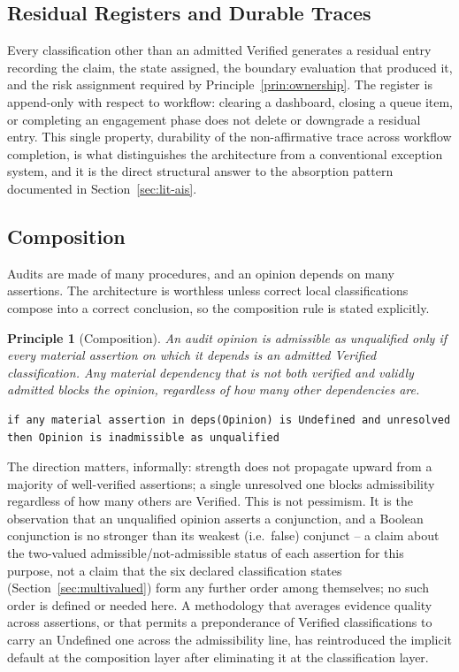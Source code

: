 \documentclass[11pt,a4paper]{article}
\newtheorem{principle}{Principle}[section]
\theoremstyle{definition}
\theoremstyle{remark}
\begin{document}
\subsection{Residual Registers and Durable Traces}
\label{sec:registers}

Every classification other than an admitted \textsf{Verified} generates a residual entry recording the claim, the state assigned, the boundary evaluation that produced it, and the risk assignment required by Principle~\ref{prin:ownership}. The register is append-only with respect to workflow: clearing a dashboard, closing a queue item, or completing an engagement phase does not delete or downgrade a residual entry. This single property, durability of the non-affirmative trace across workflow completion, is what distinguishes the architecture from a conventional exception system, and it is the direct structural answer to the absorption pattern documented in Section~\ref{sec:lit-ais}.

\subsection{Composition}
\label{sec:composition}

Audits are made of many procedures, and an opinion depends on many assertions. The architecture is worthless unless correct local classifications compose into a correct conclusion, so the composition rule is stated explicitly.

\begin{principle}[Composition]
\label{prin:composition}
An audit opinion is admissible as unqualified only if every material assertion on which it depends is an admitted \textsf{Verified} classification. Any material dependency that is not both verified and validly admitted blocks the opinion, regardless of how many other dependencies are.
\end{principle}

\begin{lstlisting}[numbers=none]
if any material assertion in deps(Opinion) is Undefined and unresolved
then Opinion is inadmissible as unqualified
\end{lstlisting}

The direction matters, informally: strength does not propagate upward from a majority of well-verified assertions; a single unresolved one blocks admissibility regardless of how many others are Verified. This is not pessimism. It is the observation that an unqualified opinion asserts a conjunction, and a Boolean conjunction is no stronger than its weakest (i.e.\ false) conjunct -- a claim about the two-valued admissible/not-admissible status of each assertion for this purpose, not a claim that the six declared classification states (Section~\ref{sec:multivalued}) form any further order among themselves; no such order is defined or needed here. A methodology that averages evidence quality across assertions, or that permits a preponderance of \textsf{Verified} classifications to carry an \textsf{Undefined} one across the admissibility line, has reintroduced the implicit default at the composition layer after eliminating it at the classification layer.
\end{document}
